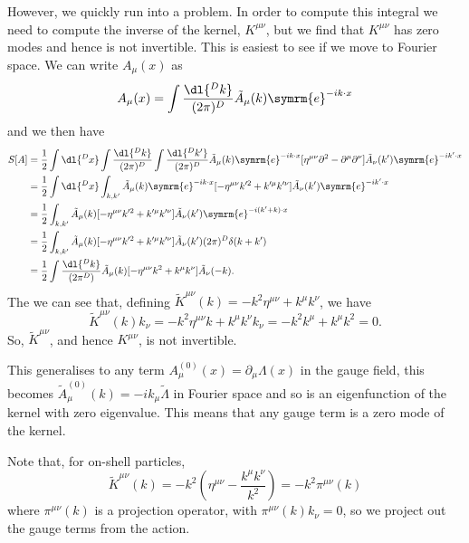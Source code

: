 \documentclass[fleqn]{NotesClass}
\newcommand{\minkowskiMetric}{\eta}
\newcommand{\dalembertian}{\partial^2}
\newcommand{\e}{\symrm{e}}
\begin{document}
    However, we quickly run into a problem.
    In order to compute this integral we need to compute the inverse of the kernel, \(K^{\mu\nu}\), but we find that \(K^{\mu\nu}\) has zero modes and hence is not invertible.
    This is easiest to see if we move to Fourier space.
    We can write \(A_\mu(x)\) as
    \begin{equation}
        A_\mu(x) = \int \frac{\dl{^Dk}}{(2\pi)^D} \tilde{A}_\mu(k) \e^{-ik \cdot x}
    \end{equation}
    and we then have
    \begin{align}
        S[A] &= \frac{1}{2} \int \dl{^Dx} \int \frac{\dl{^Dk}}{(2\pi)^D} \int \frac{\dl{^Dk'}}{(2\pi)^D} \tilde{A}_\mu(k) \e^{-ik\cdot x} [\minkowskiMetric^{\mu\nu}\dalembertian - \partial^\mu \partial^\nu] \tilde{A}_\nu(k') \e^{-ik'\cdot x}\\
        &= \frac{1}{2} \int \dl{^Dx} \int_{k,k'} \tilde{A}_\mu(k) \e^{-ik\cdot x} [-\minkowskiMetric^{\mu\nu}k'^2 + k'^\mu k'^\nu] \tilde{A}_\nu(k') \e^{-ik'\cdot x}\\
        &= \frac{1}{2} \int_{k,k'} \tilde{A}_\mu(k) [-\minkowskiMetric^{\mu\nu}k'^2 + k'^\mu k'^\nu] \tilde{A}_\nu(k') \e^{-i(k' + k)\cdot x}\\
        &= \frac{1}{2} \int_{k,k'} \tilde{A}_\mu(k) [-\minkowskiMetric^{\mu\nu}k'^2 + k'^\mu k'^\nu] \tilde{A}_\nu(k') (2\pi)^D\delta(k + k')\\
        &= \frac{1}{2} \int \frac{\dl{^Dk}}{(2\pi^D)} \tilde{A}_\mu(k) [-\minkowskiMetric^{\mu\nu}k^2 + k^\mu k^\nu] \tilde{A}_\nu(-k).
    \end{align}
    The we can see that, defining \(\tilde{K}^{\mu\nu}(k) = -k^2\minkowskiMetric^{\mu\nu} + k^\mu k^\nu\), we have
    \begin{equation}
        \tilde{K}^{\mu\nu}(k)k_\nu = -k^2 \minkowskiMetric^{\mu\nu} k + k^\mu k^\nu k_\nu = -k^2 k^\mu + k^\mu k^2 = 0.
    \end{equation}
    So, \(\tilde{K}^{\mu\nu}\), and hence \(K^{\mu\nu}\), is not invertible.
    
    This generalises to any term \(A^{(0)}_\mu(x) = \partial_\mu \Lambda(x)\) in the gauge field, this becomes \(\tilde{A}^{(0)}_\mu(k) = -ik_\mu \tilde{\Lambda}\) in Fourier space and so is an eigenfunction of the kernel with zero eigenvalue.
    This means that any gauge term is a zero mode of the kernel.
    
    Note that, for on-shell particles,
    \begin{equation}
        \tilde{K}^{\mu\nu}(k) = -k^2 \left( \minkowskiMetric^{\mu\nu} - \frac{k^\mu k^\nu}{k^2} \right) = -k^2\pi^{\mu\nu}(k)
    \end{equation}
    where \(\pi^{\mu\nu}(k)\) is a projection operator, with \(\pi^{\mu\nu}(k)k_\nu = 0\), so we project out the gauge terms from the action.
    
\end{document}
